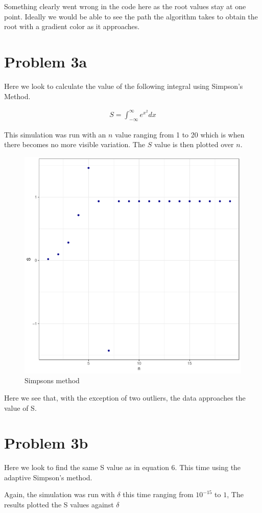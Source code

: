 \documentclass[prb,twocolumn]{revtex4-2}
\begin{document}
Something clearly went wrong in the code here as the root values stay at one point. Ideally we would be able to see the path the algorithm takes to obtain the root with a gradient color as it approaches.

\section{Problem 3a}

Here we look to calculate the value of the following integral using Simpson's Method.

\begin{eqnarray}
S = \int_{-\infty}^\infty e^{x^2}dx
\label{namefornewequation}
\end{eqnarray}

This simulation was run with an $n$ value ranging from 1 to 20 which is when there becomes no more visible variation. The $S$ value is then plotted over $n$. 

\begin{figure}[h!]
\centerline{\includegraphics [width=3 in] {simpsons}} \caption{Simpsons method} \label{simpsons}
\end{figure}

Here we see that, with the exception of two outliers, the data approaches the value of S.

\section{Problem 3b}

Here we look to find the same S value as in equation 6. This time using the adaptive Simpson's method.

Again, the simulation was run with $\delta$ this time ranging from $10^{-15}$ to $1$, The results plotted the S values against $\delta$
\end{document}
